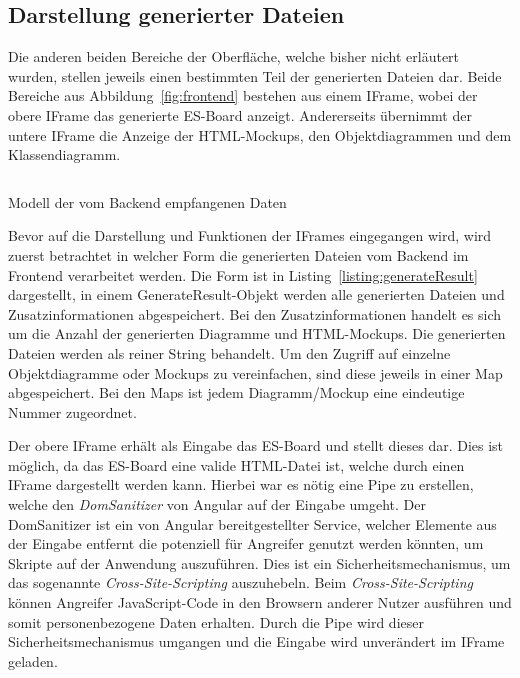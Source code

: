 \subsection{Darstellung generierter Dateien}\label{subsec:darstellung-generierter-dateien}
Die anderen beiden Bereiche der Oberfläche, welche bisher nicht erläutert wurden, stellen jeweils einen bestimmten Teil der generierten Dateien dar.
Beide Bereiche aus Abbildung~\ref{fig:frontend} bestehen aus einem IFrame, wobei der obere IFrame das generierte \ac{ES}-Board anzeigt.
Andererseits übernimmt der untere IFrame die Anzeige der HTML-Mockups, den Objektdiagrammen und dem Klassendiagramm.

\begin{listing}[!ht]
    \inputminted{ts}{listings/3.2/GenerateResult.ts}
    \caption{Modell der vom Backend empfangenen Daten}
    \label{listing:generateResult}
\end{listing}

Bevor auf die Darstellung und Funktionen der IFrames eingegangen wird, wird zuerst betrachtet in welcher Form die generierten Dateien vom Backend im Frontend verarbeitet werden.
Die Form ist in Listing~\ref{listing:generateResult} dargestellt, in einem GenerateResult-Objekt werden alle generierten Dateien und Zusatzinformationen abgespeichert.
Bei den Zusatzinformationen handelt es sich um die Anzahl der generierten Diagramme und HTML-Mockups.
Die generierten Dateien werden als reiner String behandelt.
Um den Zugriff auf einzelne Objektdiagramme oder Mockups zu vereinfachen, sind diese jeweils in einer Map abgespeichert.
Bei den Maps ist jedem Diagramm/Mockup eine eindeutige Nummer zugeordnet.

Der obere IFrame erhält als Eingabe das \ac{ES}-Board und stellt dieses dar.
Dies ist möglich, da das \ac{ES}-Board eine valide HTML-Datei ist, welche durch einen IFrame dargestellt werden kann.
Hierbei war es nötig eine Pipe zu erstellen, welche den \textit{DomSanitizer} von Angular auf der Eingabe umgeht\cite*{safe-pipe}.
Der DomSanitizer ist ein von Angular bereitgestellter Service, welcher Elemente aus der Eingabe entfernt die potenziell für Angreifer genutzt werden könnten, um
Skripte auf der Anwendung auszuführen.
Dies ist ein Sicherheitsmechanismus, um das sogenannte \textit{Cross-Site-Scripting} auszuhebeln.
Beim \textit{Cross-Site-Scripting} können Angreifer JavaScript-Code in den Browsern anderer Nutzer ausführen und somit personenbezogene Daten erhalten\cite*{xss}.
Durch die Pipe wird dieser Sicherheitsmechanismus umgangen und die Eingabe wird unverändert im IFrame geladen.

